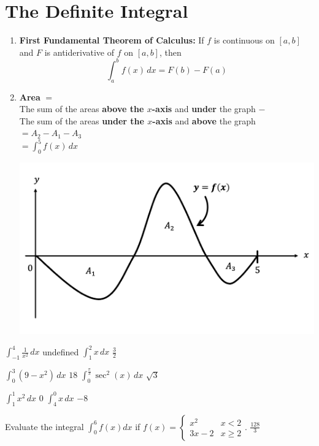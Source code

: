 \section{The Definite Integral}

\begin{myframe}[arc=10pt,auto outer arc]
\begin{enumerate}
\item \textbf{First Fundamental Theorem of Calculus:} If $f$ is continuous on $[a, b]$ and $F$ is antiderivative of $f$ on $[a, b]$, then
\[
\int_a^b f(x) \,dx = F(b) - F(a)
\]

\item \textbf{Area} $=$ \\
The sum of the areas \textbf{above the $x$-axis} and \textbf{under} the graph
$-$ \\
The sum of the areas \textbf{under the $x$-axis} and \textbf{above} the graph \\
$\displaystyle = A_2 - A_1 - A_3$ \\
$\displaystyle = \int_0^5 f(x) \,dx$ 

\includegraphics[width=0.7\linewidth]{chapter4/area}

\end{enumerate}
\end{myframe}

\pairofprobsans%
{$\displaystyle \int_{-1}^4 \frac{1}{x^2} \, dx$ }{undefined}
{$\displaystyle \int_{1}^2 x \, dx $ }{$\displaystyle \frac{3}{2}$}

\newpage
\pairofprobsans%
{$\displaystyle \int_0^3 \left( 9-x^2 \right) \, dx$ }{$\displaystyle 18$}
{$\displaystyle \int_0^{\frac{\pi}{3}} \sec^2{(x)} \, dx $ }{$\displaystyle \sqrt{3}$}

\pairofprobsans%
{$\displaystyle \int_1^1 x^2 \, dx$ }{$\displaystyle 0$}
{$\displaystyle \int_4^0 x \, dx $ }{$\displaystyle -8$}

\newpage
\problemans%
{Evaluate the integral $\displaystyle \int_0^6 f(x) dx$ if
	$ \displaystyle f(x) = \begin{cases} 
		x^2 & x < 2 \\
		3x-2 & x\geq 2 
	\end{cases}
	$.
	}%
{$\displaystyle \frac{128}{3}$}



